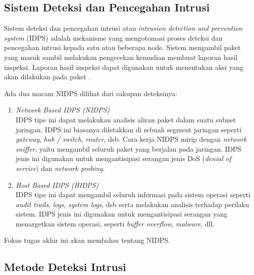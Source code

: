   \subsection{Sistem Deteksi dan Pencegahan Intrusi}

    Sistem deteksi dan pencegahan intrusi atau \emph{intrusion detection and prevention system} (IDPS) adalah mekanisme yang mengotomasi proses deteksi dan pencegahan intrusi kepada satu atau beberapa node. Sistem mengambil paket yang masuk sambil melakukan pengecekan kemudian membuat laporan hasil inspeksi. Laporan hasil inspeksi dapat digunakan untuk menentukan aksi yang akan dilakukan pada paket \citep{nist2007}.

    Ada dua macam NIDPS dilihat dari cakupan deteksinya:
    \begin{enumerate}

      \item 
      \emph{Network Based IDPS (NIDPS)} \\
      IDPS tipe ini dapat melakukan analisis aliran paket dalam suatu subnet jaringan. IDPS ini biasanya diletakkan di sebuah segment jaringan seperti \emph{gateway}, \emph{hub / switch}, \emph{router}, dsb. Cara kerja NIDPS mirip dengan \emph{network sniffer}, yaitu mengambil seluruh paket yang berjalan pada jaringan. IDPS jenis ini digunakan untuk mengantisipasi serangan jenis DoS (\emph{denial of service}) dan \emph{network probing}.

       \item 
      \emph{Host Based IDPS (HIDPS)} \\
      IDPS tipe ini dapat mengambil seluruh informasi pada sistem operasi seperti \emph{audit trails}, \emph{logs}, \emph{system logs}, dsb serta melakukan analisis terhadap perilaku sistem. IDPS jenis ini digunakan untuk mengantisipasi serangan yang menargetkan sistem operasi, seperti \emph{buffer overflow}, \emph{malware}, dll.

    \end{enumerate}

    Fokus tugas akhir ini akan membahas tentang NIDPS.

  \subsection{Metode Deteksi Intrusi}

